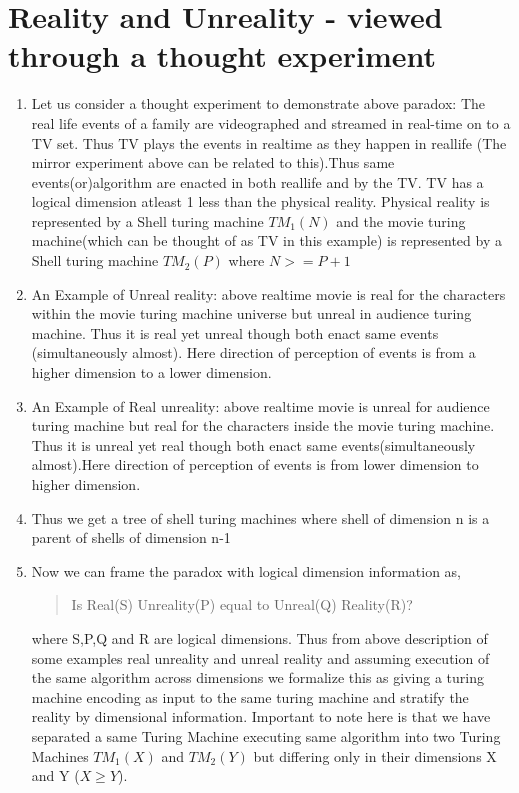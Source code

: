 \documentclass[11pt,onecolumn]{article}
\begin{document}
\section{Reality and Unreality - viewed through a thought experiment}
\begin{enumerate}
\item Let us consider a thought experiment to demonstrate above paradox:
The real life events of a family are videographed and streamed in real-time on to a TV set. Thus TV plays the events in realtime as they happen in reallife (The mirror experiment above can be related to this).Thus same events(or)algorithm are enacted in both reallife and by the TV. TV has a logical dimension atleast 1 less than the physical reality. Physical reality is represented by a Shell turing machine $TM_{1}(N)$ and the movie turing machine(which can be thought of as TV in this example) is represented by a Shell turing machine $TM_{2}(P)$ where $N >= P+1$

\item An Example of Unreal reality: above realtime movie is real for the characters within the movie turing machine universe but unreal in audience turing machine. Thus it is real yet unreal though both enact same events (simultaneously almost). Here direction of perception of events is from a higher dimension to a lower dimension.

\item An Example of Real unreality: above realtime movie is unreal for audience turing machine but real for the characters inside the movie turing machine. Thus it is unreal yet real though both enact same events(simultaneously almost).Here direction of perception of events is from lower dimension to higher dimension.

\item Thus we get a tree of shell turing machines where shell of dimension n is a parent of shells of dimension n-1


\item Now we can frame the paradox with logical dimension information as,
\begin{quote}
Is Real(S) Unreality(P) equal to Unreal(Q) Reality(R)?
\end{quote}
where S,P,Q and R are logical dimensions. Thus from above description of some examples real unreality and unreal reality and assuming execution of the same algorithm across dimensions we formalize this as giving a turing machine encoding  as input to the same turing machine and stratify the reality by dimensional information. Important to note here is that we have separated a same Turing Machine executing same algorithm into two Turing Machines $TM_{1}(X)$ and $TM_{2}(Y)$ but differing only in their dimensions X and Y ($X \geq Y$).
\end{enumerate}
\end{document}
